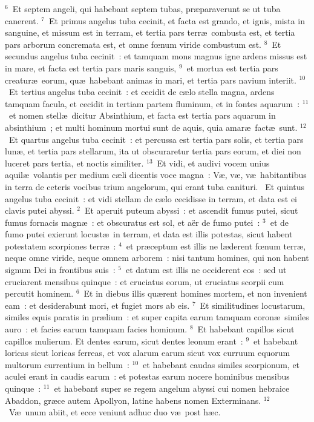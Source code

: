 ${}^{6}$~Et septem angeli, qui habebant septem tubas, pr\ae paraverunt se ut tuba canerent.
${}^{7}$~Et primus angelus tuba cecinit, et facta est grando, et ignis, mista in sanguine, et missum est in terram, et tertia pars terr\ae\ combusta est, et tertia pars arborum concremata est, et omne fœnum viride combustum est.
${}^{8}$~Et secundus angelus tuba cecinit~: et tamquam mons magnus igne ardens missus est in mare, et facta est tertia pars maris sanguis,
${}^{9}$~et mortua est tertia pars creatur\ae\ eorum, qu\ae\ habebant animas in mari, et tertia pars navium interiit.
${}^{10}$~Et tertius angelus tuba cecinit~: et cecidit de c\ae lo stella magna, ardens tamquam facula, et cecidit in tertiam partem fluminum, et in fontes aquarum~:
${}^{11}$~et nomen stell\ae\ dicitur Absinthium, et facta est tertia pars aquarum in absinthium~; et multi hominum mortui sunt de aquis, quia amar\ae\ fact\ae\ sunt.
${}^{12}$~Et quartus angelus tuba cecinit~: et percussa est tertia pars solis, et tertia pars lun\ae , et tertia pars stellarum, ita ut obscuraretur tertia pars eorum, et diei non luceret pars tertia, et noctis similiter.
${}^{13}$~Et vidi, et audivi vocem unius aquil\ae\ volantis per medium c\ae li dicentis voce magna~: V\ae , v\ae , v\ae\ habitantibus in terra de ceteris vocibus trium angelorum, qui erant tuba canituri.
~\lettrine[lines=10,image=true,loversize=0.05,lraise=-0.03]{E}{}t quintus angelus tuba cecinit~: et vidi stellam de c\ae lo cecidisse in terram, et data est ei clavis putei abyssi.
${}^{2}$~Et aperuit puteum abyssi~: et ascendit fumus putei, sicut fumus fornacis magn\ae~: et obscuratus est sol, et a\"er de fumo putei~:
${}^{3}$~et de fumo putei exierunt locust\ae\ in terram, et data est illis potestas, sicut habent potestatem scorpiones terr\ae~:
${}^{4}$~et pr\ae ceptum est illis ne l\ae derent fœnum terr\ae , neque omne viride, neque omnem arborem~: nisi tantum homines, qui non habent signum Dei in frontibus suis~:
${}^{5}$~et datum est illis ne occiderent eos~: sed ut cruciarent mensibus quinque~: et cruciatus eorum, ut cruciatus scorpii cum percutit hominem.
${}^{6}$~Et in diebus illis qu\ae rent homines mortem, et non invenient eam~: et desiderabunt mori, et fugiet mors ab eis.
${}^{7}$~Et similitudines locustarum, similes equis paratis in pr\ae lium~: et super capita earum tamquam coron\ae\ similes auro~: et facies earum tamquam facies hominum.
${}^{8}$~Et habebant capillos sicut capillos mulierum. Et dentes earum, sicut dentes leonum erant~:
${}^{9}$~et habebant loricas sicut loricas ferreas, et vox alarum earum sicut vox curruum equorum multorum currentium in bellum~:
${}^{10}$~et habebant caudas similes scorpionum, et aculei erant in caudis earum~: et potestas earum nocere hominibus mensibus quinque~:
${}^{11}$~et habebant super se regem angelum abyssi cui nomen hebraice Abaddon, gr\ae ce autem Apollyon, latine habens nomen Exterminans.
${}^{12}$~V\ae\ unum abiit, et ecce veniunt adhuc duo v\ae\ post h\ae c.


